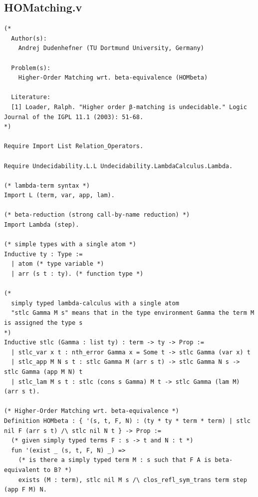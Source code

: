 \subsection*{HOMatching.v}
\begin{lstlisting}
(*
  Author(s):
    Andrej Dudenhefner (TU Dortmund University, Germany)

  Problem(s):
    Higher-Order Matching wrt. beta-equivalence (HOMbeta)

  Literature:
  [1] Loader, Ralph. "Higher order β-matching is undecidable." Logic Journal of the IGPL 11.1 (2003): 51-68.
*)

Require Import List Relation_Operators.

Require Undecidability.L.L Undecidability.LambdaCalculus.Lambda.

(* lambda-term syntax *)
Import L (term, var, app, lam).

(* beta-reduction (strong call-by-name reduction) *)
Import Lambda (step).

(* simple types with a single atom *)
Inductive ty : Type :=
  | atom (* type variable *)
  | arr (s t : ty). (* function type *)

(*
  simply typed lambda-calculus with a single atom
  "stlc Gamma M s" means that in the type environment Gamma the term M is assigned the type s
*)
Inductive stlc (Gamma : list ty) : term -> ty -> Prop :=
  | stlc_var x t : nth_error Gamma x = Some t -> stlc Gamma (var x) t
  | stlc_app M N s t : stlc Gamma M (arr s t) -> stlc Gamma N s -> stlc Gamma (app M N) t
  | stlc_lam M s t : stlc (cons s Gamma) M t -> stlc Gamma (lam M) (arr s t).

(* Higher-Order Matching wrt. beta-equivalence *)
Definition HOMbeta : { '(s, t, F, N) : (ty * ty * term * term) | stlc nil F (arr s t) /\ stlc nil N t } -> Prop :=
  (* given simply typed terms F : s -> t and N : t *)
  fun '(exist _ (s, t, F, N) _) =>
    (* is there a simply typed term M : s such that F A is beta-equivalent to B? *)
    exists (M : term), stlc nil M s /\ clos_refl_sym_trans term step (app F M) N.

\end{lstlisting}


